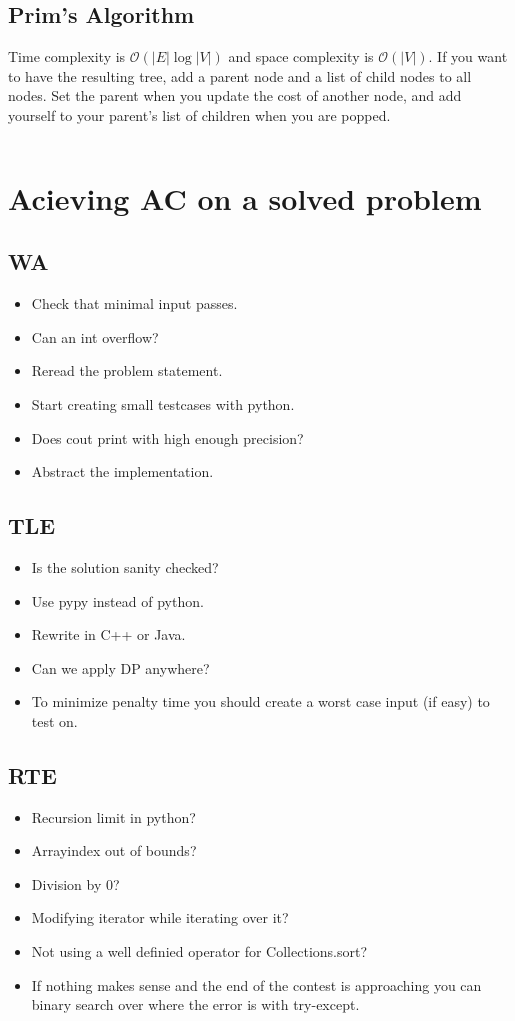 \documentclass[8pt,a4paper,landscape,oneside]{amsart}
\newcommand{\code}[1]{\inputminted[fontsize=\normalsize,baselinestretch=1]{java}{code/#1}}
\newcommand{\bigO}{\mathcal{O}}
\begin{document}
\begin{multicols*}{3}
  \subsection{Prim's Algorithm}
  Time complexity is $\bigO(|E| \log{|V|})$ and space complexity is $\bigO(|V|)$. If you want to have the resulting tree, add a parent node and a list of child nodes to all nodes. Set the parent when you update the cost of another node, and add yourself to your parent's list of children when you are popped.
  \code{Graphs/MST.java}
        
\section{Acieving AC on a solved problem}
    \subsection{WA}
        \begin{itemize}
        \item Check that minimal input passes.
        \item Can an int overflow?
        \item Reread the problem statement.
        \item Start creating small testcases with python.
        \item Does cout print with high enough precision?
        \item Abstract the implementation.
        \end{itemize}
    \subsection{TLE}
        \begin{itemize}
        \item Is the solution sanity checked?
        \item Use pypy instead of python.
        \item Rewrite in C++ or Java.
        \item Can we apply DP anywhere?
        \item To minimize penalty time you should create a worst case input (if easy) to test on.
        \end{itemize}
    \subsection{RTE}
        \begin{itemize}
        \item Recursion limit in python?
        \item Arrayindex out of bounds?
        \item Division by $0$?
        \item Modifying iterator while iterating over it?
        \item Not using a well definied operator for Collections.sort?
        \item If nothing makes sense and the end of the contest is approaching you 
            can binary search over where the error is with try-except.
        \end{itemize}

\end{multicols*}
\end{document}
